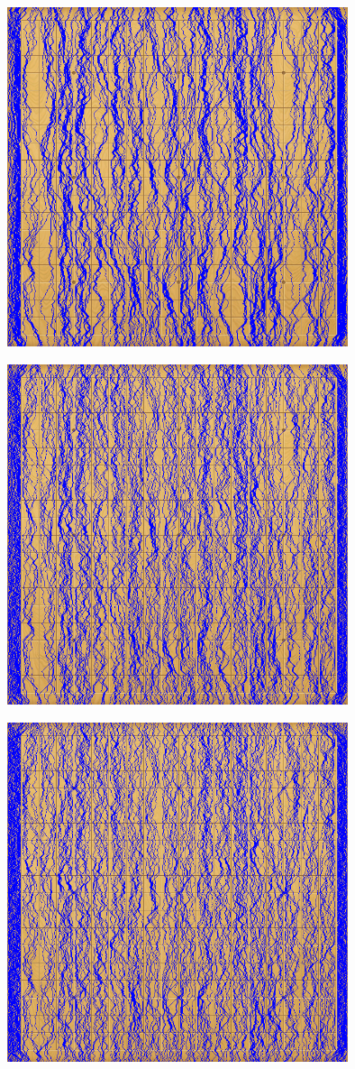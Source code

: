 \documentclass{ctexart}
\begin{document}
\includegraphics[width=10cm,height=10cm]{2_seam_2.png}

\includegraphics[width=10cm,height=10cm]{2_seam_3.png}

\includegraphics[width=10cm,height=10cm]{2_seam_4.png}
\end{document}
